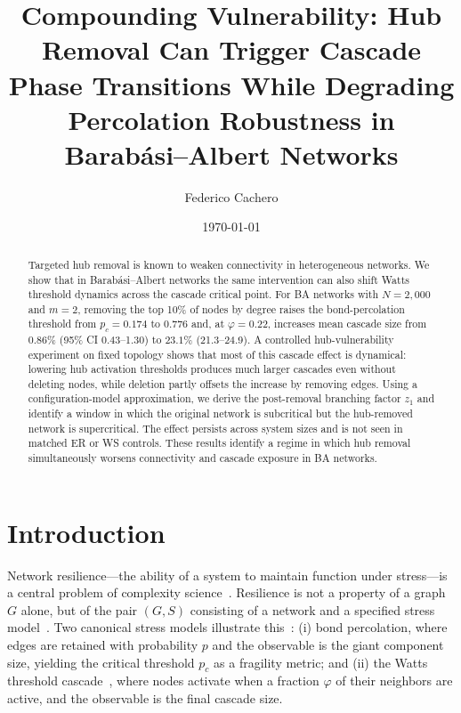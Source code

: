 \documentclass[aps,pre,twocolumn,superscriptaddress,showpacs]{revtex4-2}
\newcommand{\pc}{p_c}
\begin{document}
\title{Compounding Vulnerability: Hub Removal Can Trigger Cascade Phase Transitions While Degrading Percolation Robustness in Barab\'asi--Albert Networks}

\author{Federico Cachero}

\date{\today}

\begin{abstract}
Targeted hub removal is known to weaken connectivity in heterogeneous networks. We show that in Barab\'asi--Albert networks the same intervention can also shift Watts threshold dynamics across the cascade critical point. For BA networks with $N=2{,}000$ and $m=2$, removing the top 10\% of nodes by degree raises the bond-percolation threshold from $\pc=0.174$ to $0.776$ and, at $\varphi=0.22$, increases mean cascade size from $0.86\%$ (95\% CI 0.43--1.30) to $23.1\%$ (21.3--24.9). A controlled hub-vulnerability experiment on fixed topology shows that most of this cascade effect is dynamical: lowering hub activation thresholds produces much larger cascades even without deleting nodes, while deletion partly offsets the increase by removing edges. Using a configuration-model approximation, we derive the post-removal branching factor $z_1$ and identify a window in which the original network is subcritical but the hub-removed network is supercritical. The effect persists across system sizes and is not seen in matched ER or WS controls. These results identify a regime in which hub removal simultaneously worsens connectivity and cascade exposure in BA networks.
\end{abstract}


\maketitle

\section{Introduction}
\label{sec:intro}

Network resilience---the ability of a system to maintain function under stress---is a central problem of complexity science~\cite{Boccaletti2006,Gao2016,Barabasi2016,Artime2024,Valdez2020}. Resilience is not a property of a graph $G$ alone, but of the pair $(G, S)$ consisting of a network and a specified stress model~\cite{Alderson2010}. Two canonical stress models illustrate this~\cite{Stauffer2014,Newman2010}: (i) bond percolation, where edges are retained with probability $p$ and the observable is the giant component size, yielding the critical threshold $\pc$ as a fragility metric; and (ii) the Watts threshold cascade~\cite{Watts2002}, where nodes activate when a fraction $\varphi$ of their neighbors are active, and the observable is the final cascade size.
\end{document}
